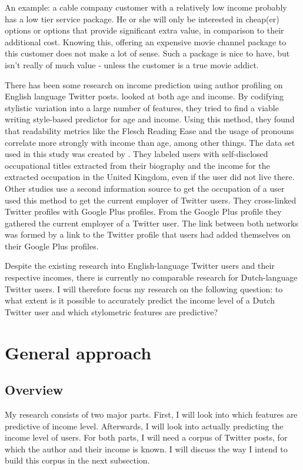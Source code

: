 \documentclass[11pt, a4paper]{article}
\begin{document}
An example: a cable company customer with a relatively low income probably has a low tier service package. He or she will only be interested in cheap(er) options or options that provide significant extra value, in comparison to their additional cost. Knowing this, offering an expensive movie channel package to this customer does not make a lot of sense. Such a package is nice to have, but isn't really of much value - unless the customer is a true movie addict.

There has been some research on income prediction using author profiling on English language Twitter posts. \citet{flekova} looked at both age and income. By codifying stylistic variation into a large number of features, they tried to find a viable writing style-based predictor for age and income. Using this method, they found that readability metrics like the Flesch Reading Ease and the usage of pronouns correlate more strongly with income than age, among other things. The data set used in this study was created by \citet{pietro}. They labeled users with self-disclosed occupational titles extracted from their biography and the income for the extracted occupation in the United Kingdom, even if the user did not live there. Other studies use a second information source to get the occupation of a user  \citet{li} used this method to get the current employer of Twitter users. They cross-linked Twitter profiles with Google Plus profiles. From the Google Plus profile they gathered the current employer of a Twitter user. The link between both networks was formed by a link to the Twitter profile that users had added themselves on their Google Plus profiles.

Despite the existing research into English-language Twitter users and their respective incomes, there is currently no comparable research for Dutch-language Twitter users. I will therefore focus my research on the following question: to what extent is it possible to accurately predict the income level of a Dutch Twitter user and which stylometric features are predictive?

\section{General approach}
\subsection{Overview}
My research consists of two major parts. First, I will look into which features are predictive of income level. Afterwards,  I will look into actually predicting the income level of users. For both parts, I will need a corpus of Twitter posts, for which the author and their income is known. I will discuss the way I intend to build this corpus in the next subsection. 
\end{document}
